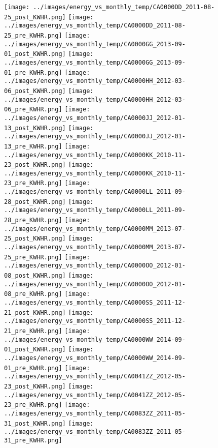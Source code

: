 \clearpage
\begin{figure}
\centering
\texttt{[image: ../images/energy\_vs\_monthly\_temp/CA0000DD\_2011-08-25\_post\_KWHR.png]}
\texttt{[image: ../images/energy\_vs\_monthly\_temp/CA0000DD\_2011-08-25\_pre\_KWHR.png]}
\texttt{[image: ../images/energy\_vs\_monthly\_temp/CA0000GG\_2013-09-01\_post\_KWHR.png]}
\texttt{[image: ../images/energy\_vs\_monthly\_temp/CA0000GG\_2013-09-01\_pre\_KWHR.png]}
\texttt{[image: ../images/energy\_vs\_monthly\_temp/CA0000HH\_2012-03-06\_post\_KWHR.png]}
\texttt{[image: ../images/energy\_vs\_monthly\_temp/CA0000HH\_2012-03-06\_pre\_KWHR.png]}
\texttt{[image: ../images/energy\_vs\_monthly\_temp/CA0000JJ\_2012-01-13\_post\_KWHR.png]}
\texttt{[image: ../images/energy\_vs\_monthly\_temp/CA0000JJ\_2012-01-13\_pre\_KWHR.png]}
\texttt{[image: ../images/energy\_vs\_monthly\_temp/CA0000KK\_2010-11-23\_post\_KWHR.png]}
\texttt{[image: ../images/energy\_vs\_monthly\_temp/CA0000KK\_2010-11-23\_pre\_KWHR.png]}
\texttt{[image: ../images/energy\_vs\_monthly\_temp/CA0000LL\_2011-09-28\_post\_KWHR.png]}
\texttt{[image: ../images/energy\_vs\_monthly\_temp/CA0000LL\_2011-09-28\_pre\_KWHR.png]}
\texttt{[image: ../images/energy\_vs\_monthly\_temp/CA0000MM\_2013-07-25\_post\_KWHR.png]}
\texttt{[image: ../images/energy\_vs\_monthly\_temp/CA0000MM\_2013-07-25\_pre\_KWHR.png]}
\texttt{[image: ../images/energy\_vs\_monthly\_temp/CA0000OO\_2012-01-08\_post\_KWHR.png]}
\texttt{[image: ../images/energy\_vs\_monthly\_temp/CA0000OO\_2012-01-08\_pre\_KWHR.png]}
\texttt{[image: ../images/energy\_vs\_monthly\_temp/CA0000SS\_2011-12-21\_post\_KWHR.png]}
\texttt{[image: ../images/energy\_vs\_monthly\_temp/CA0000SS\_2011-12-21\_pre\_KWHR.png]}
\texttt{[image: ../images/energy\_vs\_monthly\_temp/CA0000WW\_2014-09-01\_post\_KWHR.png]}
\texttt{[image: ../images/energy\_vs\_monthly\_temp/CA0000WW\_2014-09-01\_pre\_KWHR.png]}
\texttt{[image: ../images/energy\_vs\_monthly\_temp/CA0041ZZ\_2012-05-23\_post\_KWHR.png]}
\texttt{[image: ../images/energy\_vs\_monthly\_temp/CA0041ZZ\_2012-05-23\_pre\_KWHR.png]}
\texttt{[image: ../images/energy\_vs\_monthly\_temp/CA0083ZZ\_2011-05-31\_post\_KWHR.png]}
\texttt{[image: ../images/energy\_vs\_monthly\_temp/CA0083ZZ\_2011-05-31\_pre\_KWHR.png]}
\end{figure}
